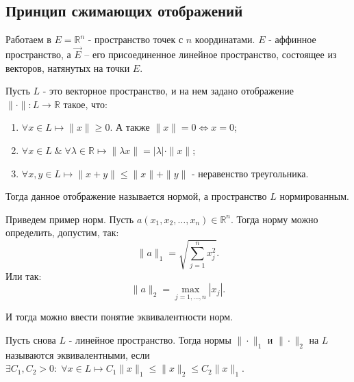 



	\subsection*{Принцип сжимающих отображений}
	
	Работаем в $E =\mathbb{R}^n$ - пространство точек с $n$ координатами. $E$ - аффинное пространство, а $\vec{E}$ -- его присоединенное линейное пространство, состоящее из векторов, натянутых на точки $E$.
	
	\begin{definition}
		Пусть $L$ - это векторное пространство, и на нем задано отображение $\|\cdot\|:L\longrightarrow \mathbb{R}$ такое, что:
		\begin{enumerate}
			\item $\forall x \in L \longmapsto \|x\| \geqslant 0$. А также $\|x\| = 0 \Longleftrightarrow x = 0$;
			
			\item $\forall x \in L \; \& \; \forall \lambda \in \mathbb{R} \longmapsto \|\lambda x\| = |\lambda| \cdot \|x\|$;
			
			\item $\forall x, y \in L \longmapsto \|x+y\| \leqslant \|x\| + \|y\|$ - неравенство треугольника.
		\end{enumerate}
		Тогда данное отображение называется нормой, а пространство $L$ нормированным.
	\end{definition}

	\begin{example}
		Приведем пример норм. Пусть $a(x_1, x_2, \dots, x_n) \in \mathbb{R}^n$. Тогда норму можно определить, допустим, так:
		\begin{equation}
			\|a\|_1 = \sqrt{\sum_{j = 1}^{n} x_j^2}.
		\end{equation}
	Или так:
		\begin{equation}
			\|a\|_2 = \max_{j = 1, \dots, n}|x_j|.
		\end{equation}
	\end{example}

	И тогда можно ввести понятие эквивалентности норм.
	
	\begin{definition}
		Пусть снова $L$ - линейное пространство. Тогда нормы $\| \cdot \|_1$ и $\| \cdot \|_2$ на $L$ называются эквивалентными, если $\exists C_1, C_2 > 0: \; \forall x \in L \longmapsto C_1\|x\|_1 \leqslant \|x\|_2 \leqslant C_2\|x\|_1$.
	\end{definition}

